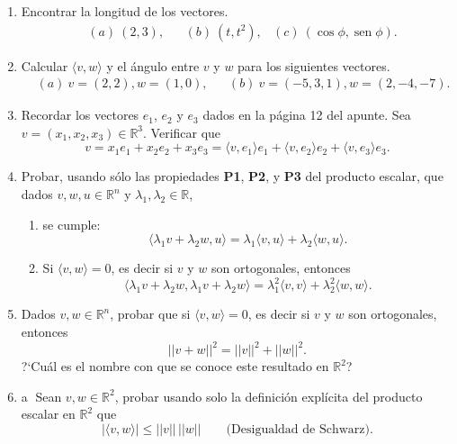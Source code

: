 \begin{enumerate}[topsep=6pt, itemsep=.4cm]
\item Encontrar la longitud de los vectores.
\begin{align*}
&(a) \ (2,3), && (b) \ (t,t^2), & (c) \ (\cos\phi,\operatorname{sen}\phi).
\end{align*}


\item Calcular $\langle v , w  \rangle$ y el {á}ngulo entre $v$ y $w$  para los siguientes vectores.
\begin{align*}
&(a) \ v=(2,2), w=(1,0), &&  (b) \  v=(-5,3,1), w=(2,-4,-7).
\end{align*}


\item Recordar los vectores $e_1$, $e_2$ y $e_3$ dados en la página 12 del apunte. Sea $v=(x_1,x_2,x_3)\in\mathbb{R}^3$.  Verificar que
$$v=x_1e_1+x_2e_2+x_3e_3=\langle v,e_1\rangle e_1+\langle v,e_2\rangle e_2+\langle v,e_3\rangle e_3.$$


\item Probar, usando sólo las propiedades \textbf{P1}, \textbf{P2}, y \textbf{P3} del producto escalar, que dados $v, w, u \in \mathbb R^n$ y $\lambda_1, \lambda_2 \in \mathbb R$,
\begin{enumerate}
    \item se cumple:
    \begin{equation*}
    \langle \lambda_1 v + \lambda_2 w , u  \rangle =  \lambda_1\langle v , u  \rangle +   \lambda_2\langle w , u  \rangle.
    \end{equation*}
    \item Si $\langle v , w  \rangle =0$, es decir si $v$ y $w$ son ortogonales,  entonces
    \begin{equation*}
        \langle \lambda_1 v + \lambda_2 w ,  \lambda_1 v + \lambda_2 w   \rangle =
        \lambda_1^2 \langle  v ,  v  \rangle + \lambda_2^2 \langle w,w  \rangle.
    \end{equation*}
\end{enumerate}



\item Dados $v, w\in \mathbb R^n$, probar que si  $\langle v , w  \rangle =0$, es decir si $v$ y $w$ son ortogonales,  entonces
    \begin{equation*}
    ||v + w||^2 = ||v||^2 + ||w||^2.
    \end{equation*}
    ?`Cuál es el nombre con que se conoce este resultado en $\mathbb R^2$?


\item\label{Schwarz} \textcircled{a} Sean $v,w\in \mathbb R^2$, probar usando  solo la definición explícita del producto escalar en $\mathbb R^2$ que
\begin{equation*}
    |\langle v , w  \rangle| \le ||v||\,||w|| \qquad \text{(Desigualdad de Schwarz).}
\end{equation*}

\end{enumerate}
